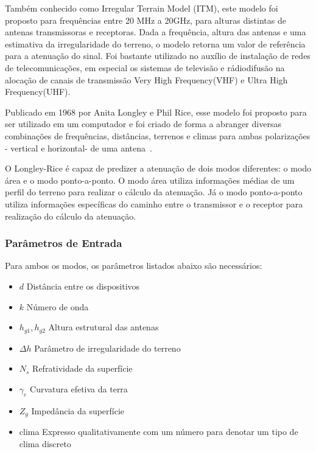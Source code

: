 Também conhecido como Irregular Terrain Model (ITM), este modelo foi proposto para frequências entre 20 MHz a 20GHz, para alturas distintas de antenas transmissoras e receptoras. Dada a frequência, altura das antenas e uma estimativa da irregularidade do terreno, o modelo retorna um valor de referência para a atenuação do sinal. Foi bastante utilizado no auxílio de instalação de redes de telecomunicações, em especial os sistemas de televisão e rádiodifusão na alocação de canais de transmissão Very High Frequency(VHF)
e Ultra High Frequency(UHF).

Publicado em 1968 por Anita Longley e Phil Rice, esse modelo foi proposto para ser utilizado em um computador e foi criado de forma a abranger diversas combinações de frequências, distâncias, terrenos e climas para ambas polarizações - vertical e horizontal- de uma antena~\cite{longleyrice}.

O Longley-Rice é capaz de predizer a atenuação de dois modos diferentes: o modo área e o modo ponto-a-ponto. O modo área utiliza informações médias de um perfil do terreno para realizar o cálculo da atenuação. Já o modo ponto-a-ponto utiliza informações específicas do caminho entre o transmissor e o receptor para realização do cálculo da atenuação.

\subsubsection{Parâmetros de Entrada}

Para ambos os modos, os parâmetros listados abaixo são necessários:

\begin{itemize}
\item \begin{math}d\end{math} Distância entre os dispositivos
\item \begin{math}k\end{math} Número de onda
\item \begin{math}h_{g1}, h_{g2}\end{math} Altura estrutural das antenas
\item \begin{math}\Delta h\end{math} Parâmetro de irregularidade do terreno
\item \begin{math}N_s\end{math} Refratividade da superfície
\item \begin{math}\gamma _e\end{math} Curvatura efetiva da terra
\item \begin{math}Z_g\end{math} Impedância da superfície
\item clima Expresso qualitativamente com um número para denotar um tipo de clima discreto
\end{itemize}

